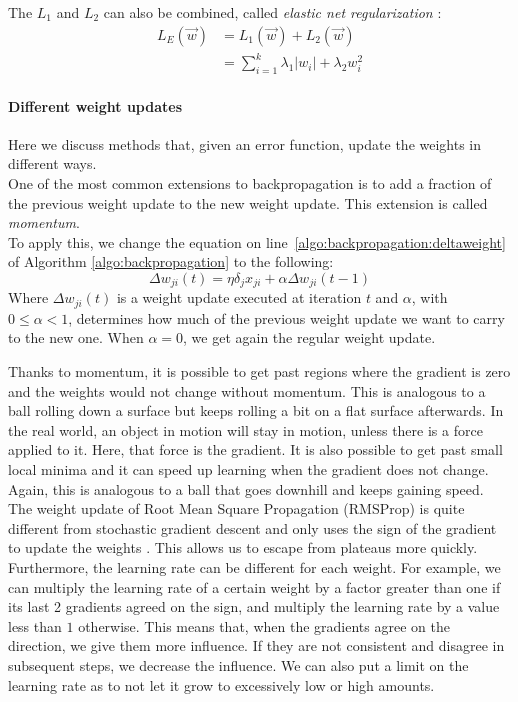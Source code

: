 The $L_1$ and $L_2$ can also be combined, called \textit{elastic net regularization} \citep{hastie2012ElasticNet}:
\begin{align}
    L_E (\overrightarrow{w}) &= L_1(\overrightarrow{w}) + L_2(\overrightarrow{w})\\
    &= \sum_{i=1}^k \lambda_1 \vert w_i \vert + \lambda_2 w_i^2
\end{align}


\paragraph{Different weight updates} %
\label{par:different_weight_updates}
Here we discuss methods that, given an error function, update the weights in different ways.\\

One of the most common extensions to backpropagation is to add a fraction of the previous weight update to the new weight update. This extension is called \textit{momentum}.\\
To apply this, we change the equation on line~\ref{algo:backpropagation:deltaweight} of Algorithm \ref{algo:backpropagation} to the following:
\begin{equation}
    \Delta w_{ji}(t) = \eta \delta_j x_{ji} + \alpha \Delta w_{ji}(t-1)
\end{equation}
Where $\Delta w_{ji}(t)$ is a weight update executed at iteration $t$ and $\alpha$, with $0 \le \alpha < 1$, determines how much of the previous weight update we want to carry to the new one. When $\alpha = 0$, we get again the regular weight update.

Thanks to momentum, it is possible to get past regions where the gradient is zero and the weights would not change without momentum.
This is analogous to a ball rolling down a surface but keeps rolling a bit on a flat surface afterwards. In the real world, an object in motion will stay in motion, unless there is a force applied to it.
Here, that force is the gradient. It is also possible to get past small local minima and it can speed up learning when the gradient does not change. Again, this is analogous to a ball that goes downhill and keeps gaining speed.\\

The weight update of Root Mean Square Propagation (RMSProp) is quite different from stochastic gradient descent and only uses the sign of the gradient to update the weights \citep{Tieleman2012LectureMagnitude.}.
This allows us to escape from plateaus more quickly. Furthermore, the learning rate can be different for each weight.
For example, we can multiply the learning rate of a certain weight by a factor greater than one if its last 2 gradients agreed on the sign, and multiply the learning rate by a value less than $1$ otherwise.
This means that, when the gradients agree on the direction, we give them more influence. If they are not consistent and disagree in subsequent steps, we decrease the influence. We can also put a limit on the learning rate as to not let it grow to excessively low or high amounts.

